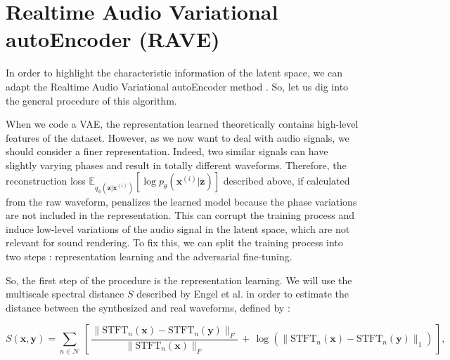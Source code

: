 \documentclass{article}
\begin{document}

\section{Realtime Audio Variational autoEncoder (RAVE)}

In order to highlight the characteristic information of the latent space, we can adapt the Realtime Audio Variational autoEncoder method \cite{caillonRAVEVariationalAutoencoder2021}. So, let us dig into the general procedure of this algorithm. 

When we code a VAE, the representation learned theoretically contains high-level features of the dataset. However, as we now want to deal with audio signals, we should consider a 
finer representation. Indeed, two similar signals can have slightly varying phases and result in totally different waveforms. Therefore, the reconstruction loss $\mathbb{E}_{q_\phi(\textbf{z} | \textbf{x}^{(i)})} [\log p_\theta(\textbf{x}^{(i)} | \textbf{z})]$ 
described above, if calculated from the raw waveform, penalizes the learned model because the phase variations are not included in the representation. This can corrupt the training process and induce low-level variations of the audio signal in the latent space, which are not relevant for sound rendering. To fix this, we can split the training process into two steps : representation learning and the adversarial fine-tuning.

So, the first step of the procedure is the representation learning. We will use the multiscale spectral distance $S$ described by Engel et al. \cite{engelDDSPDifferentiableDigital2020} in order to estimate the distance between the synthesized and real waveforms, defined by : 

\begin{equation} \label{spectral_dist}
    S(\textbf{x},\textbf{y}) = \sum_{n \in \mathcal{N}}\, \left[\, \frac{\lVert \text{STFT}_n(\textbf{x}) - \text{STFT}_n(\textbf{y}) \rVert_F}{\lVert \text{STFT}_n(\textbf{x}) \rVert_F} \,+\, \log (\lVert \text{STFT}_n(\textbf{x}) - \text{STFT}_n(\textbf{y}) \rVert_1)   \,\right],
\end{equation}
\end{document}
